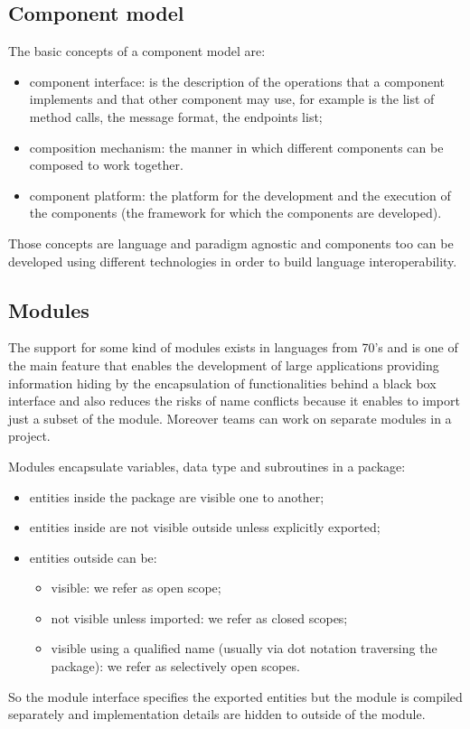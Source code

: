\subsection{Component model}
The basic concepts of a component model are:
\begin{itemize}
    \item component interface: is the description of the operations that a component implements and that other component may use, for example is the list of method calls, the message format, the endpoints list;

    \item composition mechanism: the manner in which different components can be composed to work together.
    
    \item component platform: the platform for the development and the execution of the components (the framework for which the components are developed).
\end{itemize}
Those concepts are language and paradigm agnostic and components too can be developed using different technologies in order to build language interoperability.

\subsection{Modules}
The support for some kind of modules exists in languages from 70's and is one of the main feature that enables the development of large applications providing information hiding by the encapsulation of functionalities behind a black box interface and also reduces the risks of name conflicts because it enables to import just a subset of the module.
Moreover teams can work on separate modules in a project.

Modules encapsulate variables, data type and subroutines in a package:
\begin{itemize}
    \item entities inside the package are visible one to another;
    \item entities inside are not visible outside unless explicitly exported;
    \item entities outside can be:
    \begin{itemize}
        \item visible: we refer as open scope;
        \item not visible unless imported: we refer as closed scopes;
        \item visible using a qualified name (usually via dot notation traversing the package): we refer as selectively open scopes.
    \end{itemize}
\end{itemize}
So the module interface specifies the exported entities but the module is compiled separately and implementation details are hidden to outside of the module.

